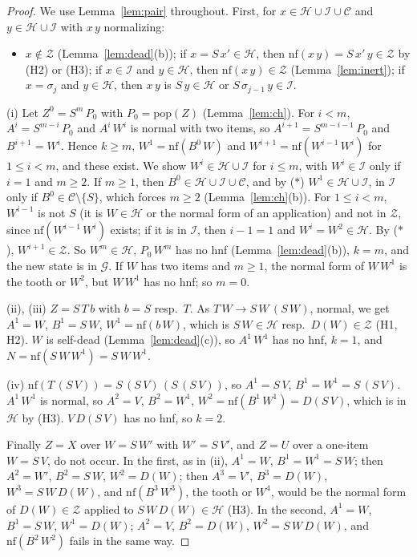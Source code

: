 \documentclass[11pt]{amsart}
\theoremstyle{definition}
\newcommand{\nf}{\mathrm{nf}}
\newcommand{\pop}{\mathrm{pop}}
\newcommand{\Hc}{\mathcal H}
\newcommand{\Ic}{\mathcal I}
\newcommand{\Gc}{\mathcal G}
\newcommand{\Cc}{\mathcal C}
\newcommand{\Zc}{\mathcal Z}
\begin{document}
\begin{proof}
We use Lemma~\ref{lem:pair} throughout. First, for $x\in\Hc\cup\Ic\cup\Cc$ and $y\in\Hc\cup\Ic$ with
$x\,y$ normalizing:
\begin{itemize}
\item[($*$)] $x\notin\Zc$ (Lemma~\ref{lem:dead}(b)); if $x=S\,x'\in\Hc$, then $\nf(x\,y)=S\,x'\,y\in\Zc$
  by (H2) or (H3); if $x\in\Ic$ and $y\in\Hc$, then $\nf(x\,y)\in\Zc$ (Lemma~\ref{lem:inert}); if
  $x=\sigma_j$ and $y\in\Hc$, then $x\,y$ is $S\,y\in\Hc$ or $S\,\sigma_{j-1}\,y\in\Ic$.
\end{itemize}
(i) Let $Z^0=S^m\,P_0$ with $P_0=\pop(Z)$ (Lemma~\ref{lem:ch}). For $i<m$, $A^i=S^{m-i}\,P_0$ and
$A^i\,W^i$ is normal with two items, so $A^{i+1}=S^{m-i-1}\,P_0$ and $B^{i+1}=W^i$. Hence $k\ge m$,
$W^1=\nf(B^0\,W)$ and $W^{i+1}=\nf(W^{i-1}\,W^i)$ for $1\le i<m$, and these exist. We show
$W^i\in\Hc\cup\Ic$ for $i\le m$, with $W^i\in\Ic$ only if $i=1$ and $m\ge2$. If $m\ge1$, then
$B^0\in\Hc\cup\Ic\cup\Cc$, and by ($*$) $W^1\in\Hc\cup\Ic$, in $\Ic$ only if $B^0\in\Cc\setminus\{S\}$,
which forces $m\ge2$ (Lemma~\ref{lem:ch}(b)). For $1\le i<m$, $W^{i-1}$ is not $S$ (it is $W\in\Hc$
or the normal form of an application) and not in $\Zc$, since $\nf(W^{i-1}\,W^i)$ exists; if it
is in $\Ic$, then $i-1=1$ and $W^i=W^2\in\Hc$. By ($*$), $W^{i+1}\in\Zc$. So $W^m\in\Hc$, $P_0\,W^m$ has
no hnf (Lemma~\ref{lem:dead}(b)), $k=m$, and the new state is in $\Gc$. If $W$ has two items and
$m\ge1$, the normal form of $W\,W^1$ is the tooth or $W^2$, but $W\,W^1$ has no hnf; so $m=0$.

(ii), (iii) $Z=S\,T\,b$ with $b=S$ resp.\ $T$. As $T\,W\to S\,W\,(S\,W)$, normal, we get $A^1=W$,
$B^1=S\,W$, $W^1=\nf(b\,W)$, which is $S\,W\in\Hc$ resp.\ $D(W)\in\Zc$ (H1, H2). $W$ is self-dead
(Lemma~\ref{lem:dead}(c)), so $A^1\,W^1$ has no hnf, $k=1$, and $N=\nf(S\,W\,W^1)=S\,W\,W^1$.

(iv) $\nf(T\,(S\,V))=S\,(S\,V)\,(S\,(S\,V))$, so $A^1=S\,V$, $B^1=W^1=S\,(S\,V)$. $A^1\,W^1$ is normal,
so $A^2=V$, $B^2=W^1$, $W^2=\nf(B^1\,W^1)=D(S\,V)$, which is in $\Hc$ by (H3). $V\,D(S\,V)$ has no hnf,
so $k=2$.

Finally $Z=X$ over $W=S\,W'$ with $W'=S\,V'$, and $Z=U$ over a one-item $W=S\,V$, do not occur.
In the first, as in (ii), $A^1=W$, $B^1=W^1=S\,W$; then $A^2=W'$, $B^2=S\,W$, $W^2=D(W)$; then
$A^3=V'$, $B^3=D(W)$, $W^3=S\,W\,D(W)$, and $\nf(B^3\,W^3)$, the tooth or $W^4$, would be the normal
form of $D(W)\in\Zc$ applied to $S\,W\,D(W)\in\Hc$ (H3). In the second,
$A^1=W$, $B^1=S\,W$, $W^1=D(W)$; $A^2=V$, $B^2=D(W)$, $W^2=S\,W\,D(W)$, and $\nf(B^2\,W^2)$ fails
in the same way.
\end{proof}
\end{document}
